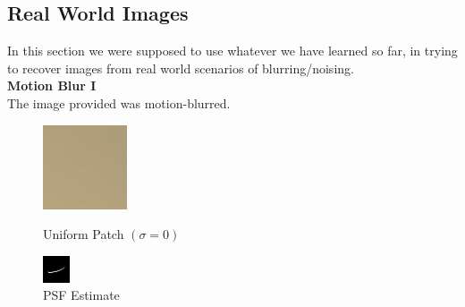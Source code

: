 \documentclass{article}
\begin{document}
    \pagebreak


    
    \subsection*{Real World Images}
    In this section we were supposed to use whatever we have learned so far, in trying to recover images from real world scenarios of blurring/noising.\\[1pt]
    \textbf{Motion Blur I}\\
    The image provided was motion-blurred.\\[3pt]
    \begin{figure}[!htb]
     \centering
      \includegraphics[scale=2.2]{./real_world/shan/uniform.png}
      \caption{Uniform Patch \((\sigma = 0)\)}
    \endminipage\hfill
    \centering
      \includegraphics[scale=3.5]{./real_world/shan/psf.png}
      \caption{PSF Estimate}
    \endminipage\hfill
    \end{figure}
\end{document}

